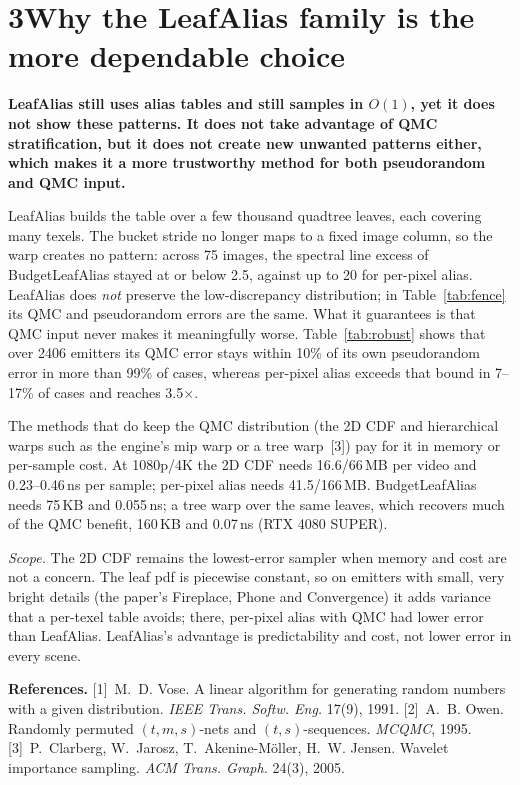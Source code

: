 \documentclass[10pt]{article}
\begin{document}
\section*{3\quad Why the LeafAlias family is the more dependable choice}

\textbf{LeafAlias still uses alias tables and still samples in $O(1)$, yet it does not show these patterns. It does not take advantage of QMC stratification, but it does not create new unwanted patterns either, which makes it a more trustworthy method for both pseudorandom and QMC input.}

LeafAlias builds the table over a few thousand quadtree leaves, each covering many texels. The bucket stride no longer maps to a fixed image column, so the warp creates no pattern: across 75 images, the spectral line excess of BudgetLeafAlias stayed at or below 2.5, against up to 20 for per-pixel alias. LeafAlias does \emph{not} preserve the low-discrepancy distribution; in Table~\ref{tab:fence} its QMC and pseudorandom errors are the same. What it guarantees is that QMC input never makes it meaningfully worse. Table~\ref{tab:robust} shows that over 2406 emitters its QMC error stays within 10\% of its own pseudorandom error in more than 99\% of cases, whereas per-pixel alias exceeds that bound in 7--17\% of cases and reaches 3.5$\times$.

The methods that do keep the QMC distribution (the 2D CDF and hierarchical warps such as the engine's mip warp or a tree warp~[3]) pay for it in memory or per-sample cost. At 1080p/4K the 2D CDF needs 16.6/66\,MB per video and 0.23--0.46\,ns per sample; per-pixel alias needs 41.5/166\,MB. BudgetLeafAlias needs 75\,KB and 0.055\,ns; a tree warp over the same leaves, which recovers much of the QMC benefit, 160\,KB and 0.07\,ns (RTX 4080 SUPER).

\emph{Scope.} The 2D CDF remains the lowest-error sampler when memory and cost are not a concern. The leaf pdf is piecewise constant, so on emitters with small, very bright details (the paper's Fireplace, Phone and Convergence) it adds variance that a per-texel table avoids; there, per-pixel alias with QMC had lower error than LeafAlias. LeafAlias's advantage is predictability and cost, not lower error in every scene.

\vspace{-0.3em}
{\footnotesize\noindent\textbf{References.} [1]~M.~D. Vose. A linear algorithm for generating random numbers with a given distribution. \emph{IEEE Trans. Softw. Eng.} 17(9), 1991. [2]~A.~B. Owen. Randomly permuted $(t,m,s)$-nets and $(t,s)$-sequences. \emph{MCQMC}, 1995. [3]~P.~Clarberg, W.~Jarosz, T.~Akenine-M\"oller, H.~W. Jensen. Wavelet importance sampling. \emph{ACM Trans. Graph.} 24(3), 2005.\par}
\end{document}
